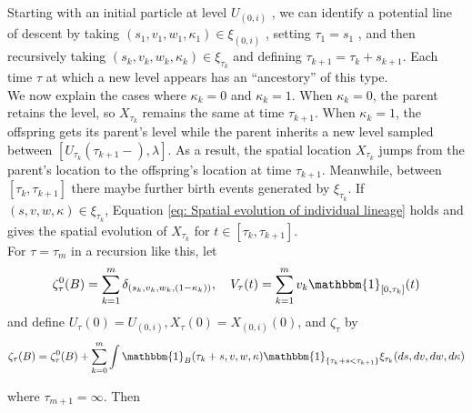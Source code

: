 \documentclass[12pt]{article}
\begin{document}
Starting with an initial particle at level $U_{(0,i)}$ , we can identify a potential line of descent by
taking $(s_1 , v_1 , w_1 , \kappa_1 ) \in \xi_{(0,i)}$ , setting $\tau_1=s_1$ , and then recursively taking $(s_k , v_k , w_k , \kappa_k ) \in \xi_{\tau_k }$ and defining $\tau_{k+1} = \tau_{k} + s_{k+1}$. Each time $\tau$ at which a new level appears has an “ancestory” of this type.\\
We now explain the cases where $\kappa_k=0$ and $\kappa_k=1$. When $\kappa_k=0$, the parent retains the level, so $X_{\tau_{k}}$ remains the same at time $\tau_{k+1}$. When $\kappa_k=1$, the offspring gets its parent's level while the parent inherits a new level sampled between $[U_{\tau_k}(\tau_{k+1}-),\lambda]$. As a result, the spatial location $X_{\tau_{k}}$ jumps from the parent's location to the offspring's location at time $\tau_{k+1}$.  Meanwhile, between $[\tau_k, \tau_{k+1}]$ there maybe further birth events generated by $\xi_{\tau_k}$. If $(s,v,w,\kappa) \in \xi_{\tau_k}$, Equation \eqref{eq: Spatial evolution of individual lineage} holds and gives the spatial evolution of $X_{\tau_k}$ for $t \in [\tau_k, \tau_{k+1}]$.\\

For $\tau=\tau_m$ in a recursion like this, let
\begin{equation}\label{eq: Individual Evolution Recursion Terms}
\zeta^{0}_{\tau}(B)=\sum_{k=1}^{m}\delta_{(s_k,v_k,w_k,(1-\kappa_k))}, ~~~ V_{\tau}(t)=\sum_{k=1}^{m}v_k\mathbbm{1}_{[0, \tau_k]}  (t)  
\end{equation}
and define $U_{\tau}(0)=U_{(0,i)}, X_{\tau}(0)=X_{(0,i)}(0)$, and $\zeta_{\tau}$ by
\begin{equation}\label{eq: integrand in spatial tracing}
\zeta_{\tau}(B)=\zeta_{\tau}^{0}(B)+\sum_{k=0}^{m}\int \mathbbm{1}_{B}(\tau_k+s,v,w,\kappa)\mathbbm{1}_{\{\tau_k+s<\tau_{k+1}\}}\xi_{\tau_k}(ds,dv,dw,d\kappa)    
\end{equation}

where $\tau_{m+1}=\infty$. Then 
\end{document}
